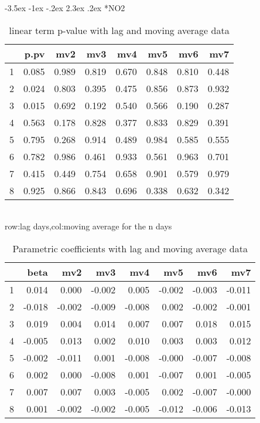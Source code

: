 \documentclass[a4paper, 12pt]{article}
\makeatletter
\def\large{\fontsize{14}{20}\selectfont}
\renewcommand\subsection{\@startsection {subsection}{1}{\z@}%
                                   {-3.5ex \@plus -1ex \@minus -.2ex}%
                                   {2.3ex \@plus.2ex}%
                                   {\centering\normalfont\large\bfseries}}
\makeatother
\begin{document}
\subsection*{NO2}
\begin{table}[h]
\centering
\caption{linear term p-value with lag and moving average data}
\begin{tabular}{rrrrrrrr}
  \hline
 & p.pv & mv2 & mv3 & mv4 & mv5 & mv6 & mv7 \\
  \hline
1 & 0.085 & 0.989 & 0.819 & 0.670 & 0.848 & 0.810 & 0.448 \\
  2 & 0.024 & 0.803 & 0.395 & 0.475 & 0.856 & 0.873 & 0.932 \\
  3 & 0.015 & 0.692 & 0.192 & 0.540 & 0.566 & 0.190 & 0.287 \\
  4 & 0.563 & 0.178 & 0.828 & 0.377 & 0.833 & 0.829 & 0.391 \\
  5 & 0.795 & 0.268 & 0.914 & 0.489 & 0.984 & 0.585 & 0.555 \\
  6 & 0.782 & 0.986 & 0.461 & 0.933 & 0.561 & 0.963 & 0.701 \\
  7 & 0.415 & 0.449 & 0.754 & 0.658 & 0.901 & 0.579 & 0.979 \\
  8 & 0.925 & 0.866 & 0.843 & 0.696 & 0.338 & 0.632 & 0.342 \\
   \hline
\end{tabular}
\\row:lag days,col:moving average for the n days
\end{table}

\begin{table}[h]
\centering
\caption{Parametric coefficients with lag and moving average data}
\begin{tabular}{rrrrrrrr}
  \hline
 & beta & mv2 & mv3 & mv4 & mv5 & mv6 & mv7 \\
  \hline
1 & 0.014 & 0.000 & -0.002 & 0.005 & -0.002 & -0.003 & -0.011 \\
  2 & -0.018 & -0.002 & -0.009 & -0.008 & 0.002 & -0.002 & -0.001 \\
  3 & 0.019 & 0.004 & 0.014 & 0.007 & 0.007 & 0.018 & 0.015 \\
  4 & -0.005 & 0.013 & 0.002 & 0.010 & 0.003 & 0.003 & 0.012 \\
  5 & -0.002 & -0.011 & 0.001 & -0.008 & -0.000 & -0.007 & -0.008 \\
  6 & 0.002 & 0.000 & -0.008 & 0.001 & -0.007 & 0.001 & -0.005 \\
  7 & 0.007 & 0.007 & 0.003 & -0.005 & 0.002 & -0.007 & -0.000 \\
  8 & 0.001 & -0.002 & -0.002 & -0.005 & -0.012 & -0.006 & -0.013 \\
   \hline
\end{tabular}
\end{table}
\end{document}
